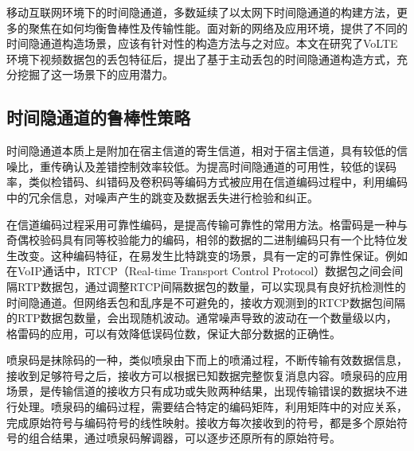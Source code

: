 移动互联网环境下的时间隐通道，多数延续了以太网下时间隐通道的构建方法，更多的聚焦在如何均衡鲁棒性及传输性能。面对新的网络及应用环境，提供了不同的时间隐通道构造场景，应该有针对性的构造方法与之对应。本文在研究了VoLTE环境下视频数据包的丢包特征后，提出了基于主动丢包的时间隐通道构造方式，充分挖掘了这一场景下的应用潜力。

\subsection{时间隐通道的鲁棒性策略}
\label{sec:intro:background:robustness}

时间隐通道本质上是附加在宿主信道的寄生信道，相对于宿主信道，具有较低的信噪比，重传确认及差错控制效率较低。为提高时间隐通道的可用性，较低的误码率，类似检错码、纠错码及卷积码等编码方式被应用在信道编码过程中，利用编码中的冗余信息，对噪声产生的跳变及数据丢失进行检验和纠正。

在信道编码过程采用可靠性编码，是提高传输可靠性的常用方法。格雷码是一种与奇偶校验码具有同等校验能力的编码，相邻的数据的二进制编码只有一个比特位发生改变。这种编码特征，在易发生比特跳变的场景，具有一定的可靠性保证。例如在VoIP通话中，RTCP（Real-time Transport Control Protocol）数据包之间会间隔RTP数据包，通过调整RTCP间隔数据包的数量，可以实现具有良好抗检测性的时间隐通道。但网络丢包和乱序是不可避免的，接收方观测到的RTCP数据包间隔的RTP数据包数量，会出现随机波动。通常噪声导致的波动在一个数量级以内，格雷码的应用，可以有效降低误码位数，保证大部分数据的正确性。

喷泉码是抹除码的一种，类似喷泉由下而上的喷涌过程，不断传输有效数据信息，接收到足够符号之后，接收方可以根据已知数据完整恢复消息内容。喷泉码的应用场景，是传输信道的接收方只有成功或失败两种结果，出现传输错误的数据块不进行处理。喷泉码的编码过程，需要结合特定的编码矩阵，利用矩阵中的对应关系，完成原始符号与编码符号的线性映射。接收方每次接收到的符号，都是多个原始符号的组合结果，通过喷泉码解调器，可以逐步还原所有的原始符号。


